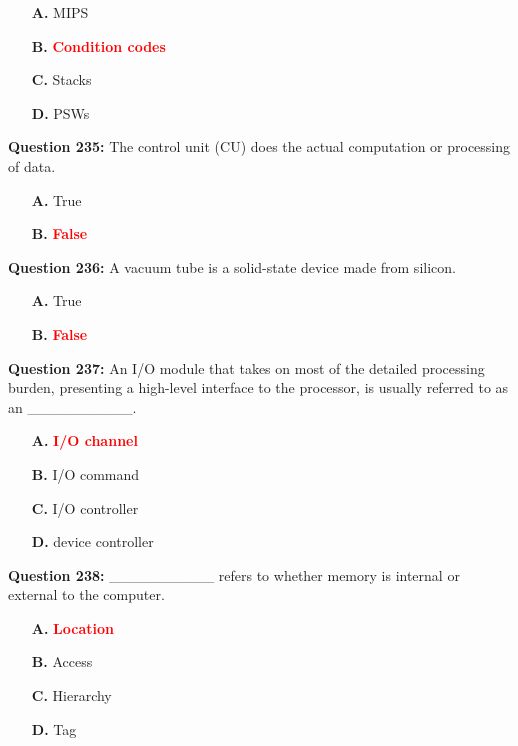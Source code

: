 \documentclass[12pt,a4paper]{article}
\begin{document}
\begin{itemize}
    \item[\textbf{A.}] MIPS
    \item[\textbf{B.}] \textcolor{red}{\textbf{Condition codes}}
    \item[\textbf{C.}] Stacks
    \item[\textbf{D.}] PSWs
\end{itemize}

\vspace{0.5cm}

\textbf{Question 235:} The control unit (CU) does the actual computation or processing of data.

\begin{itemize}
    \item[\textbf{A.}] True
    \item[\textbf{B.}] \textcolor{red}{\textbf{False}}
\end{itemize}

\vspace{0.5cm}

\textbf{Question 236:} A vacuum tube is a solid-state device made from silicon.

\begin{itemize}
    \item[\textbf{A.}] True
    \item[\textbf{B.}] \textcolor{red}{\textbf{False}}
\end{itemize}

\vspace{0.5cm}

\textbf{Question 237:} An I/O module that takes on most of the detailed processing burden, presenting a high-level interface to the processor, is usually referred to as an __________.

\begin{itemize}
    \item[\textbf{A.}] \textcolor{red}{\textbf{I/O channel}}
    \item[\textbf{B.}] I/O command
    \item[\textbf{C.}] I/O controller
    \item[\textbf{D.}] device controller
\end{itemize}

\vspace{0.5cm}

\textbf{Question 238:} __________ refers to whether memory is internal or external to the computer.

\begin{itemize}
    \item[\textbf{A.}] \textcolor{red}{\textbf{Location}}
    \item[\textbf{B.}] Access
    \item[\textbf{C.}] Hierarchy
    \item[\textbf{D.}] Tag
\end{itemize}
\end{document}
